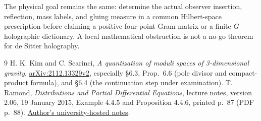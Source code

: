 \documentclass[11pt,a4paper]{article}
\begin{document}
The physical goal remains the same: determine the actual observer
insertion, reflection, mass labels, and gluing measure in a common
Hilbert-space prescription before claiming a positive four-point
Gram matrix or a finite-$G$ holographic dictionary. A local
mathematical obstruction is not a no-go theorem for de Sitter holography.

\begin{thebibliography}{9}\small
{} H. K. Kim and C. Scarinci,
\emph{A quantization of moduli spaces of 3-dimensional gravity},
\href{https://arxiv.org/abs/2112.13329v2}{arXiv:2112.13329v2},
especially \S6.3, Prop.~6.6 (pole divisor and compact-product formula),
and \S6.4 (the continuation step under examination).
 T. Ramond,
\emph{Distributions and Partial Differential Equations},
lecture notes, version 2.06, 19 January 2015,
Example 4.4.5 and Proposition 4.4.6, printed p.~87 (PDF p.~88).
\href{https://www.math.u-psud.fr/~ramond/docs/cours/distributionsedp.pdf}
{Author's university-hosted notes}.
\end{thebibliography}
\end{document}
